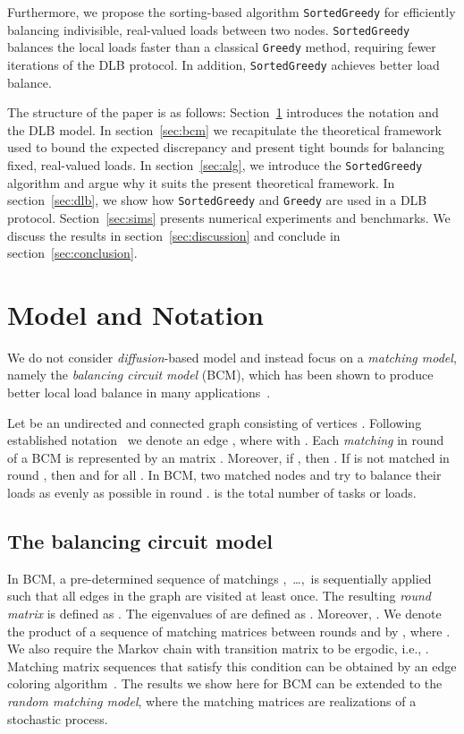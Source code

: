 \documentclass[12pt,psfig,a4]{article}
\newcommand{\sg}{\texttt{SortedGreedy}}
\newcommand{\gr}{\texttt{Greedy}}
\theoremstyle{plain}
\begin{document}
Furthermore, we propose the sorting-based algorithm \sg{} for efficiently balancing indivisible, real-valued loads between two nodes. \sg{} balances the local loads faster than a classical \gr{} method, requiring fewer iterations of the DLB protocol. In addition, \sg{} achieves better load balance.

The structure of the paper is as follows: Section~\ref{sec:matching} introduces the notation and the DLB model. In section~\ref{sec:bcm} we recapitulate the theoretical framework used to bound the expected discrepancy and present tight bounds for balancing fixed, real-valued loads. In section~\ref{sec:alg}, we introduce the \sg{} algorithm and argue why it suits the present theoretical framework. In section~\ref{sec:dlb}, we show how \sg{} and \gr{} are used in a DLB protocol. Section~\ref{sec:sims} presents numerical experiments and benchmarks. We discuss the results in section~\ref{sec:discussion} and conclude in section~\ref{sec:conclusion}.

\section{Model and Notation}
\label{sec:matching}
We do not consider \textit{diffusion}-based model and instead focus on a \textit{matching model}, namely the \textit{balancing circuit model} (BCM), which has been shown to produce better local load balance in many applications~\cite{xu1995nearest}. 

Let  be an undirected and connected graph consisting of  vertices . Following established notation~\cite{rabani1998local,sauerwald2012tight} we denote an edge , where  with .  Each \textit{matching} in round  of a BCM is represented by an  matrix . Moreover, if ,  then . If  is not matched in round , then  and  for all . In BCM, two matched nodes  and  try to balance their loads as evenly as possible in round .  is the total number of tasks or loads.\\


\subsection{The balancing circuit model}
In BCM, a pre-determined sequence of  matchings ,\, \ldots,\, is sequentially applied such that all edges in the graph are visited at least once. The resulting \textit{round matrix}  \cite{rabani1998local} is defined as . The  eigenvalues of  are defined as . Moreover, . 
We denote the product of a sequence of matching matrices between rounds  and  by , where . We also require the Markov chain with transition matrix  to be ergodic, i.e., . 
Matching matrix sequences that satisfy this condition can be obtained by an edge coloring algorithm~\cite{brelaz1979new,panconesi1997randomized}. 
The results we show here for BCM can be extended to the \textit{random matching model}, where the matching matrices are realizations of a stochastic process. 
\end{document}
